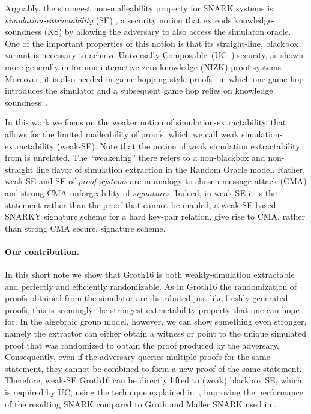 \documentclass[a4paper, 9pt]{article}
\newcommand{\MK}[1]{}
\newcommand{\Gro}{\textsf{Groth16}}
\begin{document}
%
%

Arguably, the strongest non-malleability property for SNARK systems is
\emph{simulation-extractability} (SE) \cite{sahai1999non,
  de2001robust}, a security notion that extends knowledge-soundness
(KS) by allowing the adversary to also access the simulaton
oracle. One of the important properties of this notion is that its
straight-line, blackbox variant is necessary to achieve Universally Composable~(UC~\cite{uc}) security,
as shown more generally in
\cite{canetti2002universally,groth2006perfect,groth2006simulation} for
non-interactive zero-knowledge (NIZK) proof systems. Moreover, it is
also needed in game-hopping style proofs~\cite{DBLP:journals/iacr/Shoup04} in which one game hop
introduces the simulator and a subsequent game hop relies on knowledge
soundness~\cite{kosba2016hawk,
  DBLP:conf/ccs/CamenischDD17}.



In this work we focus on the weaker notion of
simulation-extractability, that allows for the limited malleability of
proofs, which we call weak simulation-extractability (weak-SE). Note
that the notion of weak simulation extractability from
\cite{DBLP:conf/indocrypt/FaustKMV12} is unrelated. The ``weakening''
there refers to a non-blackbox and non-straight line flavor of
simulation extraction in the Random Oracle model.  Rather, weak-SE and
SE of \emph{proof systems} are in analogy to chosen message attack
(CMA) and strong CMA unforgeability of \emph{signatures}. Indeed, in weak-SE it is
the statement rather than the proof that cannot be mauled, a weak-SE based
SNARKY signature scheme for a hard key-pair relation, give rise to CMA, rather
than strong CMA secure, signature scheme.\MK{We could define and prove this.}

  \paragraph{Our contribution.}

  In this short note we show that \Gro{} is both weakly-simulation
  extractable and perfectly and efficiently randomizable. As in \Gro{}
  the randomization of proofs obtained from the simulator are
  distributed just like freshly generated proofs, this is seemingly
  the strongest extractability property that one can hope for. In the
  algebraic group model, however, we can show something even stronger,
  namely the extractor can either obtain a witness or point to the
  unique simulated proof that was randomized to obtain the proof
  produced by the adversary. Consequently, even if the adversary
  queries multiple proofs for the same statement, they cannot be
  combined to form a new proof of the same statement. Therefore,
  weak-SE \Gro{} can be directly lifted to (weak) blackbox SE, which
  is required by UC, using the technique explained
  in~\cite{baghery2019efficiency}, improving the performance of the
  resulting SNARK compared to Groth and Maller SNARK used in
  \cite{baghery2019efficiency}.
\end{document}
